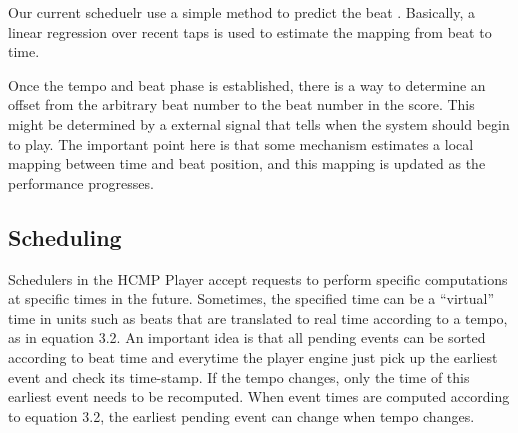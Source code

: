 Our current scheduelr use a simple method to predict the beat . 
Basically, a linear regression over recent taps is used to estimate the
mapping from beat to time. 

Once the tempo and beat phase is established, there is a way to determine
an offset from the arbitrary beat number to the beat number in the score. This might
be determined by a external signal that tells when the system should begin 
to play. The
important point here is that some mechanism estimates a local mapping between
time and beat position, and this mapping is updated as the performance progresses.

\subsection{Scheduling}

Schedulers in the HCMP Player accept requests to perform specific
computations at specific times in the future. Sometimes, the specified time 
can be a ``virtual'' time in units such as beats that are translated to real 
time according to a tempo, as in equation 3.2. An important idea is
that all pending events can be sorted according to beat time 
and everytime the player engine just pick up the earliest event and check its 
time-stamp. If the tempo changes, only the time of this
earliest event needs to be recomputed. When event times are
computed according to equation 3.2, the earliest pending event can change when tempo
changes. 

